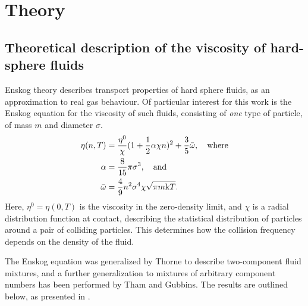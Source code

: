 \section{Theory}
\label{sec:theory}
\subsection{Theoretical description of the viscosity of hard-sphere fluids}
%
Enskog theory describes transport properties of hard sphere fluids, as an approximation to real gas behaviour.
Of particular interest for this work is the Enskog equation for the viscosity of such fluids,
consisting of \emph{one} type of particle, of mass $m$ and diameter $\sigma$.
\begin{align}
    \begin{split}
        \eta(n,T) 
            &= \frac{\eta^0}{\chi} (1+\frac{1}{2} \alpha \chi n)^2 + \frac{3}{5} \bar{\omega}, \quad \text{where}\\
        \alpha 
            &= \frac{8}{15} \pi \sigma^3, \quad \text{and} \\
        \bar{\omega} 
            &= \frac{4}{9} n^2 \sigma^4 \chi \sqrt{\pi m \mathrm{k} T}.
    \end{split}
\end{align}
Here, $\eta^0 = \eta(0, T)$ is the viscosity in the zero-density limit, 
and $\chi$ is a radial distribution function at contact, 
describing the statistical distribution of particles around a pair of colliding particles.
This determines how the collision frequency depends on the density of the fluid.

The Enskog equation was generalized by Thorne to describe two-component 
fluid mixtures\cite{ref:chapman:non_uniform_gases}, and a further 
generalization to mixtures of arbitrary component numbers has been 
performed by Tham and Gubbins\cite{ref:tham:fluid_mixtures}.
The results are outlined below, as presented in \cite{ref:pippo:composition_dependence}.

